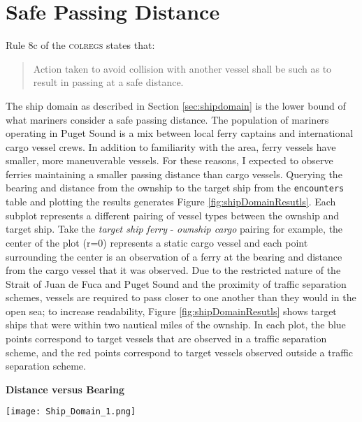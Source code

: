 \documentclass[twoside,symmetric,notoc]{tufte-book}
\begin{document}
\section{Safe Passing Distance}
\par{%
Rule 8c of the \textsc{colregs} states that:
\begin{quotation}
Action taken to avoid collision with another vessel shall be such as to result in passing at a safe distance. 
\end{quotation}
The ship domain as described in Section \ref{sec:shipdomain} is the lower bound of what mariners consider a safe passing distance. The population of mariners operating in Puget Sound is a mix between local ferry captains and international cargo vessel crews. In addition to familiarity with the area, ferry vessels have smaller, more maneuverable vessels. For these reasons, I expected to observe ferries maintaining a smaller passing distance than cargo vessels. Querying the bearing and distance from the ownship to the target ship from the \texttt{encounters} table and plotting the results generates Figure \ref{fig:shipDomainResutls}. Each subplot represents a different pairing of vessel types between the ownship and target ship. Take the \textit{target ship ferry} - \textit{ownship cargo} pairing for example, the center of the plot (r=0) represents a static cargo vessel and each point surrounding the center is an observation of a ferry at the bearing and distance from the cargo vessel that it was observed. Due to the restricted nature of the Strait of Juan de Fuca and Puget Sound and the proximity of traffic separation schemes, vessels are required to pass closer to one another than they would in the open sea; to increase readability, Figure \ref{fig:shipDomainResutls} shows target ships that were within two nautical miles of the ownship. In each plot, the blue points correspond to target vessels that are observed in a traffic separation scheme, and the red points correspond to target vessels observed outside a traffic separation scheme.
\begin{figure*}
    \centering
    \textbf{Distance versus Bearing}\par\medskip
    \texttt{[image: Ship\_Domain\_1.png]}
    \caption{Bearing and distance for all encounter types and all areas of the Puget Sound with distance less than 2nm. Blue dots are in a TSS; red dots are not.}
    \label{fig:shipDomainResutls}
\end{figure*}
}
\end{document}
